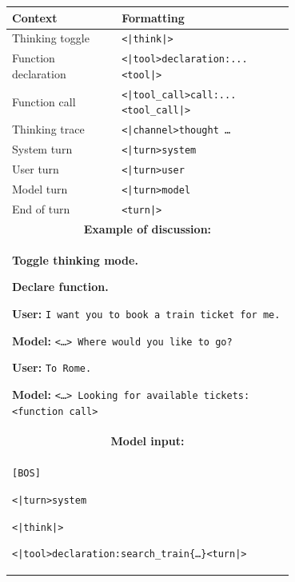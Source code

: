 \documentclass[11pt, a4paper, logo, twocolumn, copyright]{googledeepmind}
\begin{document}
\begin{table}[t]
    \centering
    \footnotesize
    \begin{tabular}{p{0.3\linewidth} p{0.4\linewidth}}
    \toprule
    \textbf{Context} & \textbf{Formatting} \\
        \midrule
        Thinking toggle & \texttt{\color{Plum}<|think|>} \\
        \midrule
        Function declaration & \texttt{\color{Orange}<|tool>declaration:...<tool|>} \\
        \midrule
        Function call & \texttt{\color{RedOrange}<|tool\_call>call:...<tool\_call|>} \\
        \midrule
        Thinking trace & \texttt{\color{SeaGreen}<|channel>thought \dots <channel|>} \\
        \midrule
        System turn & \texttt{\color{NavyBlue}<|turn>system} \\
        \midrule
        User turn & \texttt{\color{NavyBlue}<|turn>user} \\
        \midrule
        Model turn & \texttt{\color{NavyBlue}<|turn>model} \\
        \midrule
        End of turn & \texttt{\color{NavyBlue}<turn|>} \\
         \midrule
    \multicolumn{2}{c}{\textbf{Example of discussion:}} \\
    \midrule
   \multicolumn{2}{p{0.8\linewidth}}{
        \textbf{Toggle thinking mode.}\par
        \textbf{Declare function.}\par
        \textbf{User:} \texttt{I want you to book a train ticket for me.}\par
        \textbf{Model:} \texttt{<\ldots> Where would you like to go?}\par
        \textbf{User:} \texttt{To Rome.}\par
        \textbf{Model:} \texttt{<\ldots> Looking for available tickets: <function call>}
    } \\
    \midrule
    \multicolumn{2}{c}{\textbf{Model input:}} \\
    \midrule
   \multicolumn{2}{p{0.8\linewidth}}{
        \texttt{\color{red}[BOS]}\par
        \texttt{\color{NavyBlue}<|turn>system}\par
        \texttt{\color{Plum}<|think|>}\par
        \texttt{}\par
        \texttt{\texttt{\color{Orange}<|tool>declaration:search\_train\{\ldots\}<tool|>\color{NavyBlue}<turn|>}}\par
}
\end{tabular}
\end{table}
\end{document}
